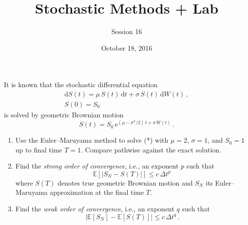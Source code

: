 \documentclass[12pt]{article}
\def\e{\mathrm e}
\def\d{\mathrm d}
\begin{document}
\title{Stochastic Methods + Lab}
\author{Session 16}
\date{October 18, 2016}
\maketitle

It is known that the stochastic differential equation
\begin{gather*}
  \d S(t) = \mu \, S(t) \, \d t + \sigma \, S(t) \, \d W(t) \,,
  \tag{*} \\
  S(0) = S_0
\end{gather*}
is solved by geometric Brownian motion
\[
  S(t) = S_0 \, \e^{(\mu - \sigma^2/2) \, t + \sigma \, W(t)} \,.
\]
\begin{enumerate}
\item Use the Euler--Maruyama method to solve (*) with $\mu=2$,
$\sigma=1$, and $S_0=1$ up to final time $T=1$.  Compare pathwise
against the exact solution.

\item Find the \emph{strong order of convergence}, i.e., an exponent
$p$ such that
\[
  \mathbb{E} [\lvert S_N - S(T) \rvert]
  \leq c \, \Delta t^p \,
\]
where $S(T)$ denotes true geometric Brownian motion and $S_N$ its
Euler--Maruyama approximation at the final time $T$.

\item Find the \emph{weak order of convergence}, i.e., an exponent $q$
such that
\[
  \lvert \mathbb{E}[S_N] - \mathbb{E}[S(T)] \rvert
  \leq c \, \Delta t^q \,.
\]

\end{enumerate}
\end{document}

